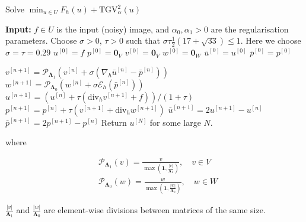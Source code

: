 \begin{algorithm}[H]
    \caption{Solve $\min_{u \in U} F_h(u) + \mathrm{TGV}^2_{\alpha}(u)$}

    \begin{algorithmic}[1]
    \STATE \textbf{Input:} $f \in U$ is the input (noisy) image, and $\alpha_0, \alpha_1 > 0$ are the regularisation parameters.
    \STATE Choose $\sigma > 0$, $\tau > 0$ such that $\sigma \tau \frac{1}{2} (17 + \sqrt{33}) \leq 1$. Here we choose $\sigma = \tau = 0.29$
    \STATE $u^{[0]} = f$
    \STATE $p^{[0]} = \mathbf{0}_V$
    \STATE $v^{[0]} = \mathbf{0}_V$
    \STATE $w^{[0]} = \mathbf{0}_W$
    \STATE $\bar{u}^{[0]} = u^{[0]}$
    \STATE $\bar{p}^{[0]} = p^{[0]}$

            \STATE $v^{[n+1]} = \mathcal{P}_{\mathbf{\Lambda}_1} \left( v^{[n]} + \sigma (\nabla_h \bar{u}^{[n]} - \bar{p}^{[n]}) \right)$
            \STATE $w^{[n+1]} = \mathcal{P}_{\mathbf{\Lambda}_0} \left( w^{[n]} + \sigma \mathcal{E}_h (\bar{p}^{[n]}) \right)$
            \STATE $u^{[n+1]} = \left( u^{[n]} + \tau (\text{div}_h v^{[n+1]} + f) \right) / ( 1 + \tau )$
            \STATE $p^{[n+1]} = p^{[n]} + \tau (v^{[n+1]} + \text{div}_h w^{[n+1]})$
            \STATE $\bar{u}^{[n+1]} = 2u^{[n+1]} - u^{[n]}$
            \STATE $\bar{p}^{[n+1]} = 2p^{[n+1]} - p^{[n]}$
    \ENDFOR
    \STATE Return $u^{[N]}$ for some large $N$.

    \end{algorithmic}
    \label{alg:pdhg_tgv_reg_map}
\end{algorithm}

where

\begin{equation}
    \begin{aligned}
    & \mathcal{P}_{\mathbf{\Lambda}_1}(v) = \frac{v}{\max \left(\mathbf{1}, \frac{|v|}{\mathbf{\Lambda}_1}\right)}, \quad v \in V \\
    & \mathcal{P}_{\mathbf{\Lambda}_0}(w) = \frac{w}{\max \left(\mathbf{1}, \frac{|w|}{\mathbf{\Lambda}_0}\right)}, \quad w \in W
    \end{aligned}
\end{equation}

$\frac{|v|}{\mathbf{\Lambda}_1}$ and $\frac{|w|}{\mathbf{\Lambda}_0}$ are element-wise divisions between matrices of the same size.


